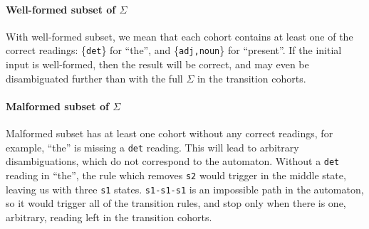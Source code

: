 \documentclass[11pt]{article}
\def\t#1{\texttt{#1}}
\def\exampleWord{{present}}
\begin{document}
\paragraph{Well-formed subset of $\Sigma$}
With well-formed subset, we mean that each cohort contains
at least one of the correct readings: \{\t{det}\} for ``the'', and
\{\t{adj,noun}\} for ``\exampleWord{}''. 
If the initial input is well-formed, then the result will be correct,
and may even be disambiguated further than with the full $\Sigma$ in
the transition cohorts.

\paragraph{Malformed subset of $\Sigma$}
Malformed subset has at least one cohort without any correct readings,
for example, ``the'' is missing a \t{det} reading.
This will lead to arbitrary disambiguations, which do not correspond to the automaton.
Without a \t{det} reading in ``the'', the rule which removes \t{s2}
would trigger in the middle state, leaving us with three \t{s1}
states. \t{s1-s1-s1} is an impossible path in the automaton,
so it would trigger all of the transition rules, and stop only when
there is one, arbitrary, reading left in the transition cohorts.




\end{document}
